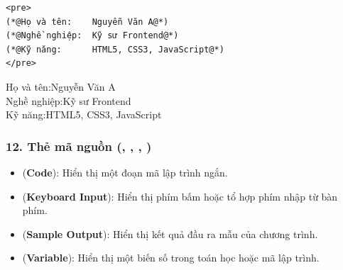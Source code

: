 \begin{codeWindow}
\begin{lstlisting}[language=HTML5]
<pre>
(*@Họ và tên:    Nguyễn Văn A@*)
(*@Nghề nghiệp:  Kỹ sư Frontend@*)
(*@Kỹ năng:      HTML5, CSS3, JavaScript@*)
</pre>
\end{lstlisting}
\end{codeWindow}
\begin{tcolorbox}[
    enhanced,
    colback=white,
    colframe=primaryBlue!20,
    arc=6pt,
    boxrule=0.8pt,
    drop shadow=black!3!white,
    top=8pt, bottom=8pt, left=12pt, right=12pt,
    title={\sffamily\bfseries\scriptsize\color{codeComment} KẾT QUẢ HIỂN THỊ TRÊN TRÌNH DUYỆT (MONOSPACE ALIGNMENT PREVIEW)},
    coltitle=codeComment,
    colbacktitle=codeBg!80!white
]
{\ttfamily
Họ và tên:\hspace{1.2cm}Nguyễn Văn A\\
Nghề nghiệp:\hspace{1.0cm}Kỹ sư Frontend\\
Kỹ năng:\hspace{1.4cm}HTML5, CSS3, JavaScript
}
\end{tcolorbox}


\subsubsection{12. Thẻ mã nguồn (, , , )}

\begin{itemize}[leftmargin=1.8em, itemsep=3pt, parsep=0pt]
    \item {} (\textbf{Code}): Hiển thị một đoạn mã lập trình ngắn.
    \item {} (\textbf{Keyboard Input}): Hiển thị phím bấm hoặc tổ hợp phím nhập từ bàn phím.
    \item {} (\textbf{Sample Output}): Hiển thị kết quả đầu ra mẫu của chương trình.
    \item {} (\textbf{Variable}): Hiển thị một biến số trong toán học hoặc mã lập trình.
\end{itemize}

